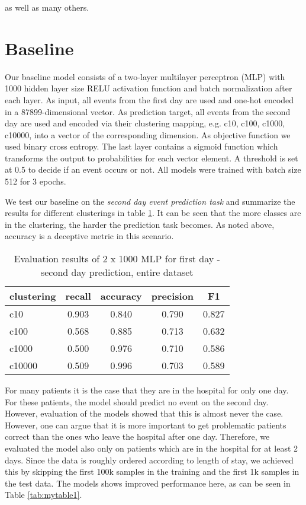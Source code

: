 as well as many others.

\newpage
\section{Baseline}
\label{sec:baseline}

Our baseline model consists of a two-layer multilayer perceptron (MLP) with 1000 hidden layer size RELU \cite{agarapDeepLearningUsing2018} activation function and batch normalization after each layer. As input, all events from the first day are used and one-hot encoded in a 87899-dimensional vector. As prediction target, all events from the second day are used and encoded via their clustering mapping, e.g. c10, c100, c1000, c10000, into a vector of the corresponding dimension. As objective function we used binary cross entropy. The last layer contains a sigmoid function which transforms the output to probabilities for each vector element. A threshold is set at 0.5 to decide if an event occurs or not. All models were trained with batch size 512 for 3 epochs.

We test our baseline on the \emph{second day event prediction task} and summarize the results for different clusterings in table \ref{tab:mytable2}. It can be seen that the more classes are in the clustering, the harder the prediction task becomes. As noted above, accuracy is a deceptive metric in this scenario.

\begin{table}[H]
  \centering
    \begin{tabular}{lcccc} \toprule
        {clustering} & {recall} & {accuracy} & {precision} & {F1}  \\ \midrule
        {c10}  & 0.903 & 0.840 & 0.790 & 0.827 \\
        {c100}  & 0.568 & 0.885 & 0.713 & 0.632 \\
        {c1000}  & 0.500  & 0.976 & 0.710  & 0.586 \\
        {c10000}  & 0.509  & 0.996 &  0.703  & 0.589 \\ \midrule
    \end{tabular}
  \caption{Evaluation results of 2 x 1000 MLP for first day - second day  prediction, entire dataset}
  \label{tab:mytable2}
\end{table}



For many patients it is the case that they are in the hospital for only one day. For these patients, the model should predict no event on the second day. However, evaluation of the models showed that this is almost never the case. However, one can argue that it is more important to get problematic patients correct than the ones who leave the hospital after one day. Therefore, we evaluated the model also only on patients which are in the hospital for at least 2 days. Since the data is roughly ordered according to length of stay, we achieved this by skipping the first 100k samples in the training and the first 1k samples in the test data. The models shows improved performance here, as can be seen in Table \ref{tab:mytable1}.


